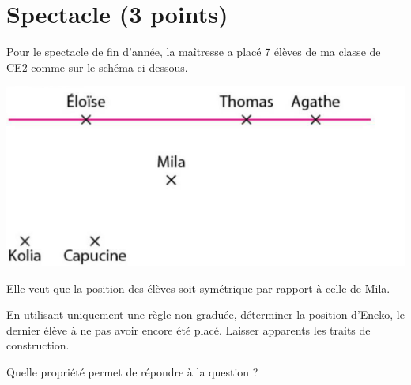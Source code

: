 \section{Spectacle (3 points)}

Pour le spectacle de fin d'année, la maîtresse a placé 7 élèves de ma classe de CE2 comme sur le schéma ci-dessous.

\begin{center}
	\includegraphics[scale=0.5]{img/spectacle}
\end{center}

Elle veut que la position des élèves soit symétrique par rapport à celle de Mila.

\begin{questions}
	\question[1\half] En utilisant uniquement une règle non graduée, déterminer la position d'Eneko, le dernier élève à ne pas avoir encore été placé. Laisser apparents les traits de construction.
	
	\question[1\half] Quelle propriété permet de répondre à la question ?
\end{questions}
